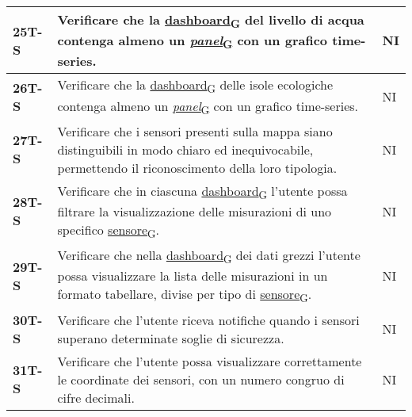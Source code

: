 \begin{longtable}{|>{\raggedright\arraybackslash}m{}|>{\raggedright\arraybackslash}m{}|>{\raggedright\arraybackslash}m{}|}
	\hline
	\textbf{25T-S}  & Verificare che la \href{https://7last.github.io/docs/rtb/documentazione-interna/glossario\#dashboard}{dashboard\textsubscript{G}} del livello di acqua contenga almeno un \href{https://7last.github.io/docs/rtb/documentazione-interna/glossario\#panel}{\textit{panel}\textsubscript{G}} con un grafico time-series.                                                                                   & NI             \\
	\hline
	\textbf{26T-S}  & Verificare che la \href{https://7last.github.io/docs/rtb/documentazione-interna/glossario\#dashboard}{dashboard\textsubscript{G}} delle isole ecologiche contenga almeno un \href{https://7last.github.io/docs/rtb/documentazione-interna/glossario\#panel}{\textit{panel}\textsubscript{G}} con un grafico time-series.                                                                                 & NI             \\
	\hline
	\textbf{27T-S}  & Verificare che i sensori presenti sulla mappa siano distinguibili in modo chiaro ed inequivocabile, permettendo il riconoscimento della loro tipologia.                                          & NI             \\
	\hline
	\textbf{28T-S}  & Verificare che in ciascuna \href{https://7last.github.io/docs/rtb/documentazione-interna/glossario\#dashboard}{dashboard\textsubscript{G}} l’utente possa filtrare la visualizzazione delle misurazioni di uno specifico \href{https://7last.github.io/docs/rtb/documentazione-interna/glossario\#sensore}{sensore\textsubscript{G}}.                                                                      & NI             \\
	\hline
	\textbf{29T-S}  & Verificare che nella \href{https://7last.github.io/docs/rtb/documentazione-interna/glossario\#dashboard}{dashboard\textsubscript{G}} dei dati grezzi l’utente possa visualizzare la lista delle misurazioni in un formato tabellare, divise per tipo di \href{https://7last.github.io/docs/rtb/documentazione-interna/glossario\#sensore}{sensore\textsubscript{G}}.                                       & NI             \\ %
	\hline
	\textbf{30T-S}  & Verificare che l’utente riceva notifiche quando i sensori superano determinate soglie di sicurezza.                                                                                          & NI             \\
	\hline
	\textbf{31T-S}  & Verificare che l’utente possa visualizzare correttamente le coordinate dei sensori, con un numero congruo di cifre decimali.                                                                     & NI             \\

\end{longtable}
